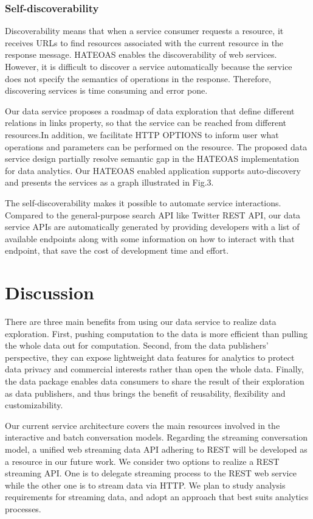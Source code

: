 \documentclass[10pt, conference, compsocconf]{IEEEtran}
\begin{document}
\subsubsection{Self-discoverability}
Discoverability means that when a service consumer requests a resource, it receives URLs to find resources associated with the current resource in the response message. HATEOAS enables the discoverability of web services. However, it is difficult to discover a service automatically because the service does not specify the semantics of operations in the response. Therefore, discovering services is time consuming and error pone.

Our data service proposes a roadmap of data exploration that define different relations in links property, so that the service can be reached from different resources.In addition, we facilitate HTTP OPTIONS to inform user what operations and parameters can be performed on the resource. The proposed data service design partially resolve semantic gap in the HATEOAS implementation for data analytics. Our HATEOAS enabled application supports auto-discovery and presents the services as a graph illustrated in Fig.3.

The self-discoverability makes it possible to automate service interactions. Compared to the general-purpose search API like Twitter REST API, our data service APIs are automatically generated by providing developers with a list of available endpoints along with some information on how to interact with that endpoint, that save the cost of development time and effort. 


\section{Discussion}
There are three main benefits from using our data service to realize data exploration. First, pushing computation to the data is more efficient than pulling the whole data out for computation. Second, from the data publishers' perspective, they can expose lightweight data features for analytics to protect data privacy and commercial interests rather than open the whole data. Finally, the data package enables data consumers to share the result of their exploration as data publishers, and thus brings the benefit of reusability, flexibility and customizability.

Our current service architecture covers the main resources involved in the interactive and batch conversation models. Regarding the streaming conversation model, a unified web streaming data API adhering to REST will be developed as a resource in our future work. We consider two options to realize a REST streaming API. One is to delegate streaming process to the REST web service while the other one is to stream data via HTTP. We plan to study analysis requirements for streaming data, and adopt an approach that best suits analytics processes.
\end{document}
